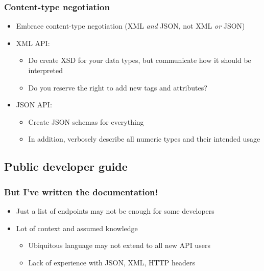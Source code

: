 \documentclass[8pt]{article}
\begin{document}
\subsubsection{Content-type negotiation}
\label{sec:org34cd5a8}
\begin{itemize}
\item Embrace content-type negotiation (XML \emph{and} JSON, not XML \emph{or} JSON)
\item XML API:
\begin{itemize}
\item Do create XSD for your data types, but communicate how it should be interpreted
\item Do you reserve the right to add new tags and attributes?
\end{itemize}
\item JSON API:
\begin{itemize}
\item Create JSON schemas for everything
\item In addition, verbosely describe all numeric types and their intended usage
\end{itemize}
\end{itemize}

\subsection{Public developer guide}
\label{sec:org4857f0c}
\subsubsection{But I've written the documentation!}
\label{sec:org554680c}
\begin{itemize}
\item Just a list of endpoints may not be enough for some developers
\item Lot of context and assumed knowledge
\begin{itemize}
\item Ubiquitous language may not extend to all new API users
\item Lack of experience with JSON, XML, HTTP headers
\end{itemize}
\end{itemize}
\end{document}
